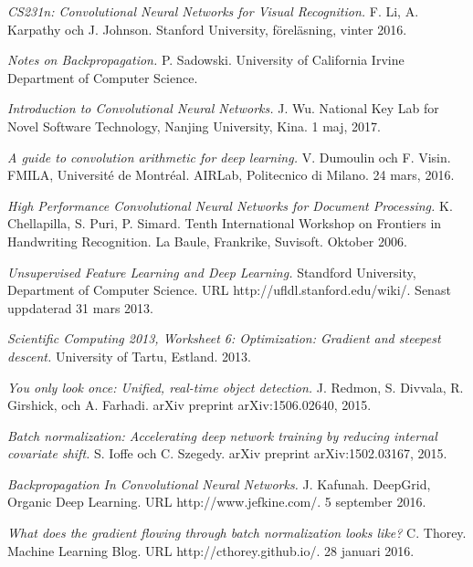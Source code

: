 \documentclass[a4paper,11pt,twoside]{article}
\begin{document}
\begin{thebibliography}{99}	
	\textit{CS231n: Convolutional Neural Networks for Visual Recognition.}
    F. Li, A. Karpathy och J. Johnson.
	Stanford University, föreläsning, vinter 2016.
	
	\textit{Notes on Backpropagation.}
    P. Sadowski.
    University of California Irvine	Department of Computer Science.
    
	\textit{Introduction to Convolutional Neural Networks.}
    J. Wu. 
    National Key Lab for Novel Software Technology, Nanjing University, Kina.
    1 maj, 2017.

	\textit{A guide to convolution arithmetic for deep learning.}
    V. Dumoulin  och F. Visin.
    FMILA, Université de Montréal. AIRLab, Politecnico di Milano.
	24 mars, 2016.

	\textit{High Performance Convolutional Neural Networks for Document Processing.}
    K. Chellapilla, S. Puri, P. Simard.
    Tenth International Workshop on Frontiers in Handwriting Recognition. 
    La Baule, Frankrike, Suvisoft.
	Oktober 2006.

	\textit{Unsupervised Feature Learning and Deep Learning.}
    Standford University, Department of Computer Science.
    URL http://ufldl.stanford.edu/wiki/.
	Senast uppdaterad 31 mars 2013.
	
	\textit{Scientific Computing 2013, Worksheet 6: Optimization: Gradient and steepest descent.}
    University of Tartu, Estland.
    2013.
    
	\textit{You only look once: Unified, real-time object detection.}
    J. Redmon, S. Divvala, R. Girshick, och A. Farhadi. 
    arXiv preprint arXiv:1506.02640, 2015.
    
	\textit{Batch normalization: Accelerating deep network training by reducing internal covariate shift.}
    S. Ioffe och C. Szegedy. 
	arXiv preprint arXiv:1502.03167, 2015.
    
	\textit{Backpropagation In Convolutional Neural Networks.}
	J. Kafunah.
    DeepGrid, Organic Deep Learning. 
    URL http://www.jefkine.com/.
	5 september 2016.

	\textit{What does the gradient flowing through batch normalization looks like?}
	C. Thorey.
    Machine Learning Blog. 
    URL http://cthorey.github.io/.
	28 januari 2016.
	

\end{thebibliography}
\end{document}
